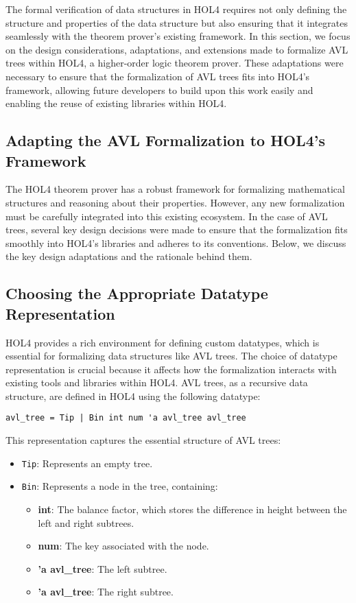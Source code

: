 \documentclass[12pt]{article}
\begin{document}
The formal verification of data structures in HOL4 requires not only defining the structure and properties of the data structure but also ensuring that it integrates seamlessly with the theorem prover's existing framework. In this section, we focus on the design considerations, adaptations, and extensions made to formalize AVL trees within HOL4, a higher-order logic theorem prover. These adaptations were necessary to ensure that the formalization of AVL trees fits into HOL4’s framework, allowing future developers to build upon this work easily and enabling the reuse of existing libraries within HOL4.

\subsection{Adapting the AVL Formalization to HOL4’s Framework}

The HOL4 theorem prover has a robust framework for formalizing mathematical structures and reasoning about their properties. However, any new formalization must be carefully integrated into this existing ecosystem. In the case of AVL trees, several key design decisions were made to ensure that the formalization fits smoothly into HOL4’s libraries and adheres to its conventions. Below, we discuss the key design adaptations and the rationale behind them.


\subsection{Choosing the Appropriate Datatype Representation}

HOL4 provides a rich environment for defining custom datatypes, which is essential for formalizing data structures like AVL trees. The choice of datatype representation is crucial because it affects how the formalization interacts with existing tools and libraries within HOL4. AVL trees, as a recursive data structure, are defined in HOL4 using the following datatype:

\begin{verbatim}
avl_tree = Tip | Bin int num 'a avl_tree avl_tree
\end{verbatim}

This representation captures the essential structure of AVL trees:
\begin{itemize}
    \item \texttt{Tip}: Represents an empty tree.
    \item \texttt{Bin}: Represents a node in the tree, containing:
        \begin{itemize}
            \item \textbf{int}: The balance factor, which stores the difference in height between the left and right subtrees.
            \item \textbf{num}: The key associated with the node.
            \item \textbf{'a avl\_tree}: The left subtree.
            \item \textbf{'a avl\_tree}: The right subtree.
        \end{itemize}
\end{itemize}
\end{document}
